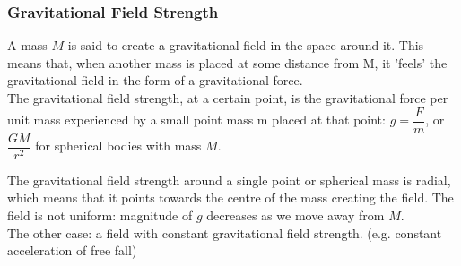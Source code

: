 \documentclass[a4paper,12pt]{article}
\begin{document}
\subsubsection*{Gravitational Field Strength}
A mass $M$ is said to create a gravitational field in the space around it. This means that, when another mass is placed at some distance from M, it 'feels' the gravitational field in the form of a gravitational force.\\
The gravitational field strength, at a certain point, is the gravitational force per unit mass experienced by a small point mass m placed at that point: $g=\dfrac{F}{m}$, or $\dfrac{GM}{r^2}$ for spherical bodies with mass $M$.\\
\begin{center}
\end{center}
The gravitational field strength around a single point or spherical mass is radial, which means that it points towards the centre of the mass creating the field. The field is not uniform: magnitude of $g$ decreases as we move away from $M$. \\
The other case: a field with constant gravitational field strength. (e.g. constant acceleration of free fall)
\begin{center}
  \end{center}
\end{document}
